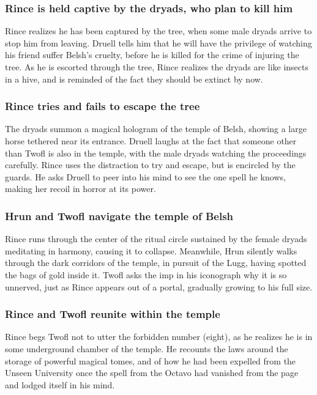 \subsubsection{\Gls{Rince} is held captive by the dryads, who plan to kill him}
\Gls{Rince} realizes he has been captured by the tree, when some male dryads arrive to stop him
from leaving. \Gls{Druell} tells him that he will have the privilege of watching his friend suffer
\Gls{Belsh}'s cruelty, before he is killed for the crime of injuring the tree. As he is escorted
through the tree, \Gls{Rince} realizes the dryads are like insects in a hive, and is reminded of
the fact they should be extinct by now.

\subsubsection{\Gls{Rince} tries and fails to escape the tree}
The dryads summon a magical hologram of the temple of \Gls{Belsh}, showing a large horse tethered
near its entrance. \Gls{Druell} laughs at the fact that someone other than \Gls{Twofl} is also
in the temple, with the male dryads watching the proceedings carefully. \Gls{Rince} uses the
distraction to try and escape, but is encircled by the guards. He asks \Gls{Druell} to peer into
his mind to see the one spell he knows, making her recoil in horror at its power.

\subsubsection{\Gls{Hrun} and \Gls{Twofl} navigate the temple of \Gls{Belsh}}
\Gls{Rince} runs through the center of the ritual circle sustained by the female dryads meditating
in harmony, causing it to collapse. Meanwhile, \Gls{Hrun} silently walks through the dark corridors
of the temple, in pursuit of the \Gls{Lugg}, having spotted the bags of gold inside it. \Gls{Twofl}
asks the imp in his iconograph why it is so unnerved, just as \Gls{Rince} appears out of a portal,
gradually growing to his full size.

\subsubsection{\Gls{Rince} and \Gls{Twofl} reunite within the temple}
\Gls{Rince} begs \Gls{Twofl} not to utter the forbidden number (eight), as he realizes he is in some
underground chamber of the temple. He recounts the laws around the storage of  powerful magical
tomes, and of how he had been expelled from the Unseen University once the spell from the Octavo
had vanished from the page and lodged itself in his mind.

